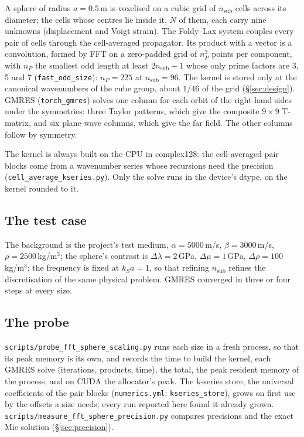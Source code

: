 \documentclass[11pt,a4paper]{article}
\newcommand{\nsub}{n_{\mathrm{sub}}}
\newcommand{\nP}{n_{P}}
\newcommand{\code}[1]{\nolinkurl{#1}}
\begin{document}
A sphere of radius $a = 0.5$\,m is voxelised on a cubic grid of $\nsub$ cells across its diameter; the cells whose
centres lie inside it, $N$ of them, each carry nine unknowns (displacement and Voigt strain). The Foldy--Lax system
couples every pair of cells through the cell-averaged propagator. Its product with a vector is a convolution, formed
by FFT on a zero-padded grid of $\nP^3$ points per component, with $\nP$ the smallest odd length at least
$2\nsub - 1$ whose only prime factors are 3, 5 and 7 (\code{fast_odd_size}): $\nP = 225$ at $\nsub = 96$. The
kernel is stored only at the canonical wavenumbers of the cube group, about $1/46$ of the grid
(\S\ref{sec:design}). GMRES (\code{torch_gmres}) solves one column for each orbit of the right-hand sides under the
symmetries: three Taylor patterns, which give the composite $9\times9$ T-matrix, and six plane-wave columns, which give
the far field. The other columns follow by symmetry.

The kernel is always built on the CPU in complex128: the cell-averaged pair blocks come from a wavenumber series
whose recursions need the precision (\code{cell_average_kseries.py}). Only the solve runs in the device's dtype,
on the kernel rounded to it.

\subsection{The test case}

The background is the project's test medium, $\alpha = 5000$\,m/s, $\beta = 3000$\,m/s, $\rho = 2500$\,kg/m$^3$; the
sphere's contrast is $\Delta\lambda = 2$\,GPa, $\Delta\mu = 1$\,GPa, $\Delta\rho = 100$\,kg/m$^3$; the frequency is
fixed at $k_S a = 1$, so that refining $\nsub$ refines the discretisation of the same physical problem. GMRES
converged in three or four steps at every size.

\subsection{The probe}

\code{scripts/probe_fft_sphere_scaling.py} runs each size in a fresh process, so that its peak memory is its own,
and records the time to build the kernel, each GMRES solve (iterations, products, time), the total, the peak resident
memory of the process, and on CUDA the allocator's peak. The k-series store, the universal coefficients of the pair
blocks (\code{numerics.yml}: \code{kseries_store}), grows on first use by the offsets a size needs; every run reported
here found it already grown. \code{scripts/measure_fft_sphere_precision.py} compares precisions and the exact Mie
solution (\S\ref{sec:precision}).
\end{document}
